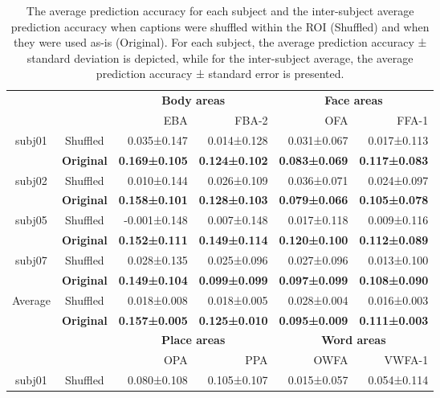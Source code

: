 \begin{table*}[t]
\centering
\caption{The average prediction accuracy for each subject and the inter-subject average prediction accuracy when captions were shuffled within the ROI (Shuffled) and when they were used as-is (Original). For each subject, the average prediction accuracy ± standard deviation is depicted, while for the inter-subject average, the average prediction accuracy ± standard error is presented.}
\vskip 0.15in
{
\begin{tabular}{@{}cc*{4}{r}@{}}
\toprule
& & \multicolumn{2}{c}{\textbf{Body areas}} & \multicolumn{2}{c}{\textbf{Face areas}} \\
\cmidrule(lr){3-4}\cmidrule(lr){5-6}
& & EBA & FBA-2 & OFA & FFA-1 \\
\midrule
\multirow[c]{2}{*}{subj01} & Shuffled & 0.035±0.147 & 0.014±0.128 & 0.031±0.067 & 0.017±0.113 \\
& \textbf{Original} & \textbf{0.169±0.105} & \textbf{0.124±0.102} & \textbf{0.083±0.069} & \textbf{0.117±0.083} \\
\cline{1-6}
\multirow[c]{2}{*}{subj02} & Shuffled & 0.010±0.144 & 0.026±0.109 & 0.036±0.071 & 0.024±0.097 \\
& \textbf{Original} & \textbf{0.158±0.101} & \textbf{0.128±0.103} & \textbf{0.079±0.066} & \textbf{0.105±0.078} \\
\cline{1-6}
\multirow[c]{2}{*}{subj05} & Shuffled & -0.001±0.148 & 0.007±0.148 & 0.017±0.118 & 0.009±0.116 \\
& \textbf{Original} & \textbf{0.152±0.111} & \textbf{0.149±0.114} & \textbf{0.120±0.100} & \textbf{0.112±0.089} \\
\cline{1-6}
\multirow[c]{2}{*}{subj07} & Shuffled & 0.028±0.135 & 0.025±0.096 & 0.027±0.096 & 0.013±0.100 \\
& \textbf{Original} & \textbf{0.149±0.104} & \textbf{0.099±0.099} & \textbf{0.097±0.099} & \textbf{0.108±0.090} \\
\cline{1-6}
\multirow[c]{2}{*}{Average} & Shuffled & 0.018±0.008 & 0.018±0.005 & 0.028±0.004 & 0.016±0.003 \\
& \textbf{Original} & \textbf{0.157±0.005} & \textbf{0.125±0.010} & \textbf{0.095±0.009} & \textbf{0.111±0.003} \\
\midrule
& & \multicolumn{2}{c}{\textbf{Place areas}} & \multicolumn{2}{c}{\textbf{Word areas}} \\
\cmidrule(lr){3-4}\cmidrule(lr){5-6}
& & OPA & PPA & OWFA & VWFA-1 \\
\midrule
\multirow[c]{2}{*}{subj01} & Shuffled & 0.080±0.108 & 0.105±0.107 & 0.015±0.057 & 0.054±0.114 \\

\end{tabular}}
\end{table*}
